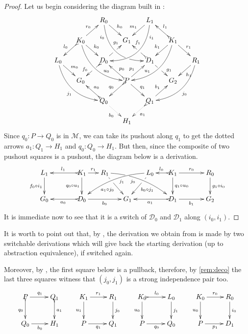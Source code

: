 \documentclass[a4paper,UKenglish,cleveref,pdftex,thm-restate,numberwithinsect,anonymous]{lipics}
\def\G{\textbf {\textup{G}}}
\newcommand{\dder}[1]{\mathscr{#1}}
\begin{document}
\thmChurch*
\label{thmChurch-proof}

\begin{proof}

  Let us begin considering the diagram
  built in :
  \[\xymatrix@C=15pt@R=15pt{&&R_0
      \ar@/_.8cm/[ddrr]_(.2){i_0}|(.7)\hole \ar[dr]^{h_0}&&
      L_1\ar@/^.8cm/[ddll]^(.2){i_1}
      \ar[dl]_{m_1}\\&K_0\ar[dr]^{k_0}\ar@{>->}[dl]_{l_0}
      \ar@/_.6cm/[ddrr]^(.65){u_0}\ar[ur]^{r_0}&& G_1 && K_1
      \ar@/^.6cm/[ddll]_(.65){u_1}\ar[dl]_{k_1}\ar@{>->}[lu]_{l_1}
      \ar[dr]^{r_1}\\L_0 \ar[dr]^{m_0} \ar@{>}@/_.6cm/[ddrr]_{j_1}&& D_0
      \ar@{>->}[dl]|(.42)\hole_(.64){f_0}\ar[ur]|(.48)\hole^(.7){g_1}&&D_1
      \ar[dr]|(.42)\hole^(.65){g_1}
      \ar@{>->}[ul]|(.48)\hole_(.7){f_1}&&R_1\ar@/^.6cm/[ddll]^{j_0}\ar[dl]^{h_1}\\&G_0
      &&P\ar[dr]^{q_1}
      \ar@{>->}[dl]_{q_0}\ar[ur]^(.4){p_1}\ar@{>->}[ul]_(.4){p_0}&&G_2\\&&Q_0
      \ar@{>->}@{>->}[ul]_{a_0} \ar@{.>}[dr]_{b_0} &&Q_1\ar[ur]^{b_1}
      \ar@{>.>}[dl]^{a_1} \\ &&&H_1 }\] Since $q_0\colon P\to Q_0$ is in
  $\mathcal{M}$, we can take its pushout along $q_1$ to get the dotted
  arrows $a_1\colon Q_1\to H_1$ and $q_0\colon Q_0\to H_1$. But then,
  since the composite of two pushout squares is a pushout, the diagram
  below is a derivation.
  \[\xymatrix@C=15pt{L_1 \ar[d]_{f_0 \circ i_1}&& K_1
      \ar[d]_{q_0\circ u_1}\ar@{>->}[ll]_{l_1} \ar[r]^{r_1} & R_1
      \ar@/^.35cm/[drrr]|(.3)\hole_(.4){j_0} \ar[dr]|(.3)\hole_{a_1\circ
        j_0} && L_0 \ar@/_.35cm/[dlll]^(.4){j_1} \ar[dl]|(.3)\hole^{b_0\circ
        j_1}& K_1 \ar[d]^{q_1\circ u_0}\ar@{>->}[l]_{l_0} \ar[rr]^{r_0} && R_0
      \ar[d]^{g_1\circ i_0} \\G_0 && \ar@{>->}[ll]^{a_0} D_0 \ar[rr]_{b_0}&&
      G_1 && \ar@{>->}[ll]^{a_1} D_1 \ar[rr]_{b_1}&& G_2}\] It is immediate
  now to see that it is a switch of $\dder{D}_0$ and $\dder{D}_1$ along
  $(i_0, i_1)$.
\end{proof}

\begin{remark}
	\label{rem:church}
	It is worth to point out that, by
	, the derivation we obtain from
	 is made by two switchable derivations which will
	give back the starting derivation (up to abstraction equivalence),
	if switched again.
	
	Moreover, by , the first square below is a
	pullback, therefore, by \cref{rem:deco} the last three squares
	witness that $(j_0, j_1)$ is a strong independence pair too.
	\[
	\xymatrix{P\ar[r]^{q_1} \ar@{>->}[d]_{q_0}&Q_1
		\ar@{>->}[d]^{a_1}&K_1 \ar[r]^{r_1} \ar[d]_{u_1}& R_1
		\ar[d]^{j_0} & K_0 \ar@{>->}[r]^{l_0} \ar[d]_{u_0}& L_0
		\ar[d]^{j_1}&K_0 \ar[r]^{r_0} \ar[d]_{u_0}& R_0\ar[d]^{i_0} \\
		Q_ 0\ar[r]_{b_0}&H_1&P \ar[r]_{q_1} & Q_1 &P \ar[r]_{q_0} &
		Q_0&P \ar[r]_{p_1} & D_1}
	\]
\end{remark}
\end{document}
